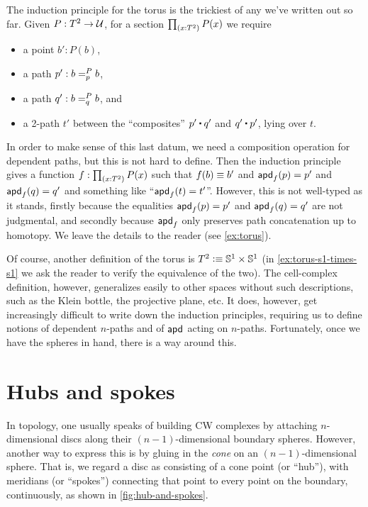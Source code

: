 %
The induction principle for the torus is the trickiest of any we've written out so far.
Given $P:T^2\to\type$, for a section $\prd{x:T^2} P(x)$ we require
\begin{itemize}
\item a point $b':P(b)$,
\item a path $p' : \dpath P p b b$,
\item a path $q' : \dpath P q b b$, and
\item a 2-path $t'$ between the ``composites'' $p'\ct q'$ and $q'\ct p'$, lying over $t$.
\end{itemize}
In order to make sense of this last datum, we need a composition operation for dependent paths, but this is not hard to define.
Then the induction principle gives a function $f:\prd{x:T^2} P(x)$ such that $f(b)\jdeq b'$ and $\apd f {p} = p'$ and $\apd f {q} = q'$ and something like ``$\apd f t = t'$''.
However, this is not well-typed as it stands, firstly because the equalities $\apd f {p} = p'$ and $\apd f {q} = q'$ are not judgmental, and secondly because $\apdfunc f$ only preserves path concatenation up to homotopy.
We leave the details to the reader (see \autoref{ex:torus}).

Of course, another definition of the torus is $T^2 \defeq \Sn^1 \times \Sn^1$ (in \autoref{ex:torus-s1-times-s1} we ask the reader to verify the equivalence of the two).
The cell-complex definition, however, generalizes easily to other spaces without such descriptions, such as the Klein bottle, the projective plane, etc.
It does, however, get increasingly difficult to write down the induction principles, requiring us to define notions of dependent $n$-paths and of $\apdfunc{}$ acting on $n$-paths.
Fortunately, once we have the spheres in hand, there is a way around this.


\section{Hubs and spokes}
\label{sec:hubs-spokes}

In topology, one usually speaks of building CW complexes by attaching $n$-dimensional discs along their $(n-1)$-dimensional boundary spheres.
%
%
However, another way to express this is by gluing in the \emph{cone} on an $(n-1)$-dimensional sphere.
That is, we regard a disc as consisting of a cone point (or ``hub''), with meridians
%
(or ``spokes'') connecting that point to every point on the boundary, continuously, as shown in \autoref{fig:hub-and-spokes}.

